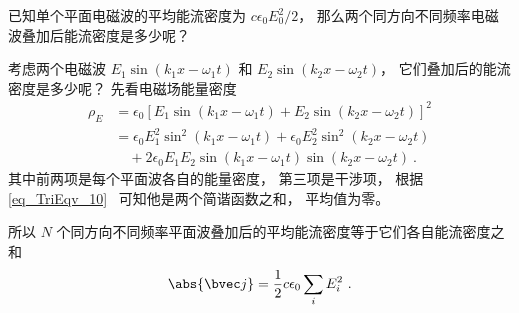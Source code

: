 

已知单个平面电磁波的平均能流密度为 $c\epsilon_0 E_0^2/2$， 那么两个同方向不同频率电磁波叠加后能流密度是多少呢？

考虑两个电磁波 $E_1 \sin(k_1 x - \omega_1 t)$ 和 $E_2 \sin(k_2x - \omega_2 t)$， 它们叠加后的能流密度是多少呢？ 先看电磁场能量密度
\begin{equation}
\begin{aligned}
\rho_E &= \epsilon_0 [E_1 \sin(k_1 x - \omega_1 t) + E_2 \sin(k_2x - \omega_2 t)]^2\\
&= \epsilon_0 E_1^2 \sin^2(k_1 x - \omega_1 t) + \epsilon_0 E_2^2 \sin^2(k_2x - \omega_2 t)\\
&\quad  + 2\epsilon_0 E_1 E_2 \sin(k_1 x - \omega_1 t) \sin(k_2x - \omega_2 t)~.
\end{aligned}
\end{equation}
其中前两项是每个平面波各自的能量密度， 第三项是干涉项， 根据\autoref{eq_TriEqv_10}~ 可知他是两个简谐函数之和， 平均值为零。

所以 $N$ 个同方向不同频率平面波叠加后的平均能流密度等于它们各自能流密度之和
\begin{equation}
\abs{\bvec j} = \frac{1}{2}c\epsilon_0 \sum_i E_i^2~.
\end{equation}
